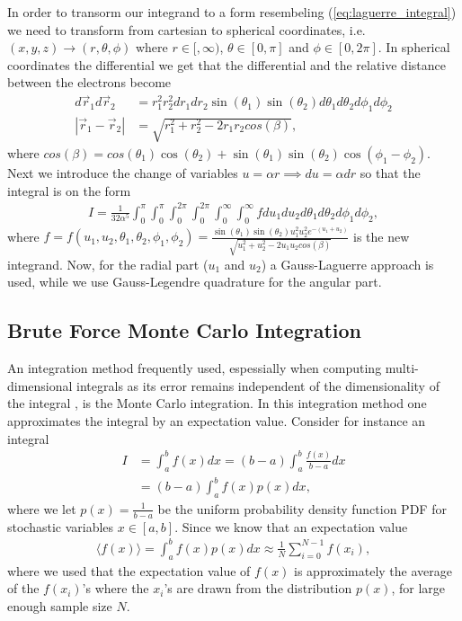 \documentclass[10pt, twocolumn]{aastex62}
\begin{document}
In order to transorm our integrand to a form resembeling
(\ref{eq:laguerre_integral}) we need to transform from cartesian to spherical
coordinates, i.e. $(x, y, z)\to(r, \theta, \phi)$ where $r\in[,\infty)$,
$\theta\in[0,\pi]$ and $\phi\in[0,2\pi]$. In spherical coordinates the
differential we get that the differential and the relative distance between the
electrons become 
\begin{align}
	d\vec{r}_1d\vec{r}_2 &= r_1^2r_2^2 dr_1dr_2\sin(\theta_1)\sin(\theta_2)d\theta_1d\theta_2d\phi_1d\phi_2\\
	|\vec{r}_1 - \vec{r}_2| &= \sqrt{r_1^2 + r_2^2 - 2r_1r_2cos(\beta)},
\end{align}
where $cos(\beta) = cos(\theta_1)\cos(\theta_2) +
\sin(\theta_1)\sin(\theta_2)\cos(\phi_1 - \phi_2)$. Next we introduce the change
of variables $u = \alpha r \implies du = \alpha dr$ so that the integral is on
the form
\begin{align}
	I = \frac{1}{32 \alpha^5} \int^\pi_0\int^{\pi}_0\int^{2\pi}_0\int^{2\pi}_0\int^\infty_0\int^\infty_0 fdu_1du_2d\theta_1d\theta_2d\phi_1d\phi_2,
	\label{eq:spherical_integral}
\end{align}
where $f = f(u_1, u_2, \theta_1, \theta_2, \phi_1, \phi_2) = \frac{\sin
	(\theta_1)\sin(\theta_2)u_1^2u_2^2e^{-(u_1+u_2)}}{\sqrt{u_1^2 + u_2^2 -
	2u_1u_2cos(\beta)}}$ is the new integrand. Now, for the radial part ($u_1$
	and $u_2$) a Gauss-Laguerre approach is used, while we use Gauss-Legendre
	quadrature for the angular part. 

\subsection{Brute Force Monte Carlo Integration}\label{subsec:brute_force_monte_carlo}
An integration method frequently used, espessially when computing
multi-dimensional integrals as its error remains independent of the
dimensionality of the integral \citep[p. 343-344]{jensen:2015}, is the Monte Carlo integration. In this integration method one
approximates the integral by an expectation value. Consider for instance an
integral 
\begin{align}
	I &= \int^b_a f(x)dx = (b-a)\int^b_a\frac{f(x)}{b-a}dx \\	
	&= (b-a)\int^b_af(x)p(x)dx,
\end{align}
where we let $p(x) = \frac{1}{b-a}$ be the uniform probability density function
PDF for stochastic variables $x\in[a, b]$. Since we know that an expectation
value 
\begin{align}
	\langle f(x)\rangle = \int^b_a f(x)p(x)dx \approx \frac{1}{N}\sum_{i=0}^{N-1} f(x_i),
\end{align}
where we used that the expectation value of $f(x)$ is approximately the average
of the $f(x_i)$'s where the $x_i$'s are drawn from the distribution $p(x)$, for
large enough sample size $N$. 
\end{document}
